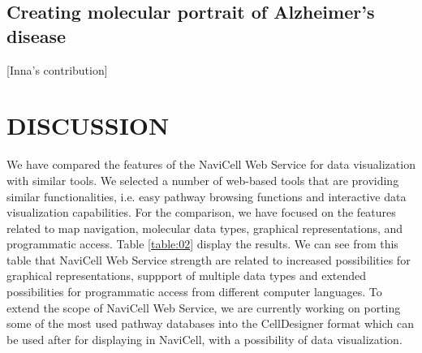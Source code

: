 \documentclass[a4,center,fleqn]{NAR}
\begin{document}
\subsection{Creating molecular portrait of Alzheimer's disease}

[Inna's contribution]

\section{DISCUSSION}

We have compared the features of the NaviCell Web Service for data visualization
with similar tools. We selected a number of web-based tools that are providing
similar functionalities, i.e. easy pathway browsing functions and interactive data
visualization capabilities. For the comparison, we have focused on the features
related to map navigation, molecular data types, graphical representations,
and programmatic access. Table \ref{table:02} display the results. 
We can see from this table that NaviCell Web Service strength are related to
increased possibilities for graphical representations, suppport of multiple
data types and extended possibilities for programmatic access from different
computer languages.  To extend the scope of NaviCell Web Service, we are
currently working on porting some of the most used pathway databases into the
CellDesigner format which can be used after for displaying in NaviCell, with a
possibility of data visualization.
\end{document}

